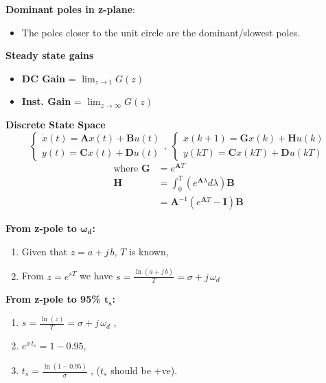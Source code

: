 \textbf{\large Dominant poles in z-plane}: 
\begin{itemize}
    \item The poles closer to the unit circle are the dominant/slowest poles.
\end{itemize}


\textbf{\large Steady state gains}
\begin{itemize}
    \item \textbf{DC Gain} = $\lim_{z\to 1} G(z)$ 
    \item \textbf{Inst. Gain} = $\lim_{z\to \infty} G(z)$
\end{itemize}

\textbf{\large Discrete State Space}
\begin{equation*}
    \begin{cases}
     \dot{x}(t) = \bm{A}x(t) + \bm{B}u(t) \\
     y(t) = \bm{C}x(t)+\bm{D} u(t)
    \end{cases}, \; \begin{cases}
     x(k+1) = \bm{G}x(k) + \bm{H}u(k) \\
     y(kT) = \bm{C}x(kT) + \bm{D}u(kT)
    \end{cases}
\end{equation*}
\begin{align*}
    \text{where } \bm{G} &= e^{\bm{A}T} \\
    \bm{H} &= \int_{0}^{T}\left(e^{\bm{A}\lambda} d\lambda\right) \bm{B} \\
    &= \bm{A}^{-1} (e^{\bm{A}T}- \bm{I})\bm{B}
\end{align*}

\textbf{From z-pole to $\bm{\omega_d}$:}

\begin{enumerate}
    \item Given that $z=a+j\, b$, $T$ is known,
    \item From $z=e^{sT}$ we have $s=\frac{\ln(a+j\, b)}{T}=\sigma + j\, \omega_d$
\end{enumerate}

\textbf{From z-pole to 95\% $\bm{t_s}$:}
\begin{enumerate}
    \item $s = \frac{\ln(z)}{T} = \sigma + j\,\omega_d$ ,
    \item $e^{\sigma \, t_s} = 1 - 0.95$,
    \item $t_s = \frac{\ln(1-0.95)}{\sigma}\;$, ($t_s$ should be +ve).
\end{enumerate}